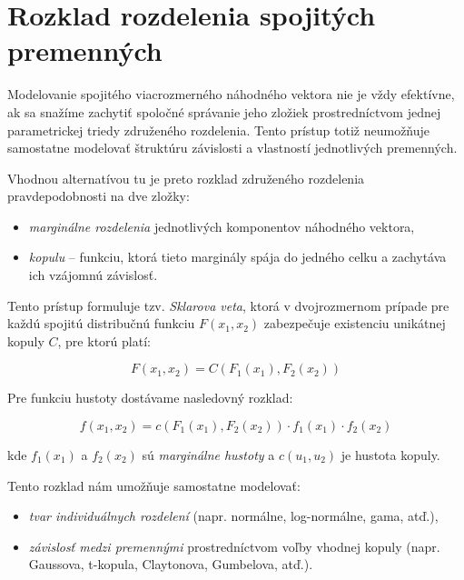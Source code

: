 \section{Rozklad rozdelenia spojitých premenných}\label{sec:rozklad_kopule}

Modelovanie spojitého viacrozmerného náhodného vektora nie je vždy efektívne, ak sa snažíme zachytiť spoločné správanie jeho zložiek prostredníctvom jednej parametrickej triedy združeného rozdelenia. Tento prístup totiž neumožňuje samostatne modelovať štruktúru závislosti a vlastností jednotlivých premenných.

Vhodnou alternatívou tu je preto rozklad združeného rozdelenia pravdepodobnosti na dve zložky:
\begin{itemize}
  \item \textit{marginálne rozdelenia} jednotlivých komponentov náhodného vektora,
  \item \textit{kopulu} – funkciu, ktorá tieto marginály spája do jedného celku a zachytáva ich vzájomnú závislosť.
\end{itemize}

Tento prístup formuluje tzv. \textit{Sklarova veta}, ktorá v dvojrozmernom prípade pre každú spojitú distribučnú funkciu $F(x_1, x_2)$ zabezpečuje existenciu unikátnej kopuly $C$, pre ktorú platí:

\begin{equation}\label{eq:copula_dist}
F(x_1, x_2) = C\left(F_1(x_1), F_2(x_2)\right)
\end{equation}

Pre funkciu hustoty dostávame nasledovný rozklad:

\begin{equation}\label{eq:copula_density}
f(x_1, x_2) = c\left(F_1(x_1), F_2(x_2)\right) \cdot f_1(x_1) \cdot f_2(x_2)
\end{equation}

kde $f_1(x_1)$ a $f_2(x_2)$ sú \textit{marginálne hustoty} a $c(u_1, u_2)$ je hustota kopuly.

Tento rozklad nám umožňuje samostatne modelovať:
\begin{itemize}
  \item \textit{tvar individuálnych rozdelení} (napr. normálne, log-normálne, gama, atď.),
  \item \textit{závislosť medzi premennými} prostredníctvom voľby vhodnej kopuly (napr. Gaussova, t-kopula, Claytonova, Gumbelova, atď.).
\end{itemize}

